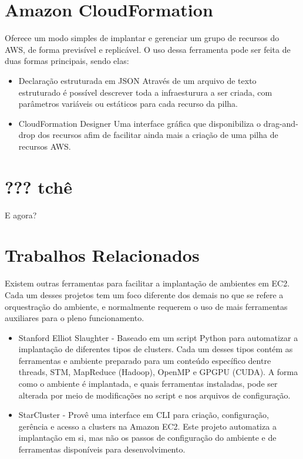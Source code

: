 \documentclass[tg]{mdtufsm}
\begin{document}
\section{Amazon CloudFormation}

Oferece um modo simples de implantar e gerenciar um grupo de recursos do AWS, de forma previsível e replicável. O uso dessa ferramenta pode ser feita de duas formas principais, sendo elas:
\begin{itemize}
\item{Declaração estruturada em JSON}
Através de um arquivo de texto estruturado é possível descrever toda a infraesturura a ser criada, com parâmetros variáveis ou estáticos para cada recurso da pilha.

\item{CloudFormation Designer}
Uma interface gráfica que disponibiliza o drag-and-drop dos recursos afim de facilitar ainda mais a criação de uma pilha de recursos AWS. 
\end{itemize}

\section{??? tchê}

E agora?

\section{Trabalhos Relacionados}

Existem outras ferramentas para facilitar a implantação de ambientes em EC2. Cada um desses projetos tem um foco diferente dos demais no que se refere a orquestração do ambiente, e normalmente requerem o uso de mais ferramentas auxiliares para o pleno funcionamento.

\begin{itemize}
	\item Stanford Elliot Slaughter - Baseado em um script Python para automatizar a implantação de diferentes tipos de clusters. Cada um desses tipos contém as ferramentas e ambiente preparado para um conteúdo específico dentre threads, STM, MapReduce (Hadoop), OpenMP e GPGPU (CUDA). A forma como o ambiente é implantada, e quais ferramentas instaladas, pode ser alterada por meio de modificações no script e nos arquivos de configuração.
	
	\item StarCluster \cite{starcluster} - Provê uma interface em CLI para criação, configuração, gerência e acesso a clusters na Amazon EC2. Este projeto automatiza a implantação em si, mas não os passos de configuração do ambiente e de ferramentas disponíveis para desenvolvimento.
\end{itemize}
\end{document}

